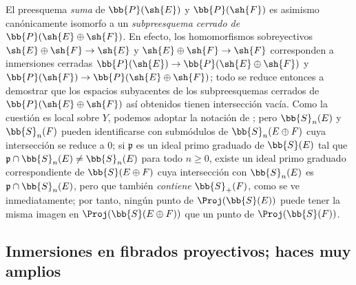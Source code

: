 \documentclass[oneside,10pt]{amsart}
\makeatletter
\renewcommand{\geq}{\geqslant}
\newcommand{\ega@arrow}[2]{\mathchoice{#1}{#2}{#2}{#2}}
\renewcommand{\to}{\ega@arrow{\longrightarrow}{\rightarrow}}
\let\EGAOriginalLabel\label
\renewcommand{\label}[1]{\phantomsection\EGAOriginalLabel{#1}}
\makeatother
\begin{document}
\begin{remark}[4.3.6]
\label{II.4.3.6}
El preesquema \emph{suma} de $\bb{P}(\sh{E})$ y $\bb{P}(\sh{F})$ es asimismo canónicamente isomorfo a un \emph{subpreesquema cerrado de $\bb{P}(\sh{E}\oplus\sh{F})$}.
En efecto, los homomorfismos sobreyectivos $\sh{E}\oplus\sh{F}\to\sh{E}$ y $\sh{E}\oplus\sh{F}\to\sh{F}$ corresponden a inmersiones cerradas $\bb{P}(\sh{E})\to\bb{P}(\sh{E}\oplus\sh{F})$ y $\bb{P}(\sh{F})\to\bb{P}(\sh{E}\oplus\sh{F})$;
todo se reduce entonces a demostrar que los espacios subyacentes de los subpreesquemas cerrados de $\bb{P}(\sh{E}\oplus\sh{F})$ así obtenidos tienen intersección vacía.
Como la cuestión es local sobre $Y$, podemos adoptar la notación de ;
pero $\bb{S}_n(E)$ y $\bb{S}_n(F)$ pueden identificarse con submódulos de $\bb{S}_n(E\oplus F)$ cuya intersección se reduce a $0$;
si $\mathfrak{p}$ es un ideal primo graduado de $\bb{S}(E)$ tal que $\mathfrak{p}\cap\bb{S}_n(E)\neq\bb{S}_n(E)$ para todo $n\geq0$, existe un ideal primo graduado correspondiente de $\bb{S}(E\oplus F)$ cuya intersección con $\bb{S}_n(E)$ es $\mathfrak{p}\cap\bb{S}_n(E)$, pero que también \emph{contiene} $\bb{S}_+(F)$, como se ve inmediatamente;
por tanto, ningún punto de $\Proj(\bb{S}(E))$ puede tener la misma imagen en $\Proj(\bb{S}(E\oplus F))$ que un punto de $\Proj(\bb{S}(F))$.
\end{remark}

\subsection{Inmersiones en fibrados proyectivos; haces muy amplios}
\label{subsection:II.4.4}
\end{document}
